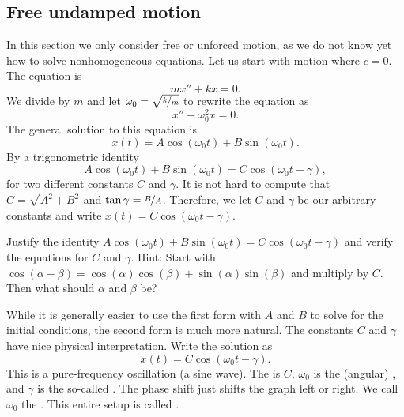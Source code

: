 \subsection{Free undamped motion}

In this section we only consider free or unforced motion,
as we do not know yet how to solve nonhomogeneous equations.  Let us start with
 motion where $c=0$.  The equation is
\begin{equation*}
mx'' + kx = 0 .
\end{equation*}
We divide by $m$ and let $\omega_0 = \sqrt{\nicefrac{k}{m}}$ to rewrite the equation as
\begin{equation*}
x'' + \omega_0^2 x = 0 .
\end{equation*}
The general solution to this equation is
\begin{equation*}
x(t) = A \cos (\omega_0 t) + B \sin (\omega_0 t) .
\end{equation*}
By a trigonometric identity
\begin{equation*}
A \cos (\omega_0 t) + B \sin (\omega_0 t) =
C \cos ( \omega_0 t - \gamma ) ,
\end{equation*}
for two different constants $C$ and $\gamma$.
It is not hard to compute that $C= \sqrt{A^2 + B^2}$ and $\tan \gamma =
\nicefrac{B}{A}$.  Therefore, we let
$C$ and $\gamma$ be our arbitrary constants and write
$x(t) = C \cos ( \omega_0 t - \gamma )$.

\begin{exercise}
Justify the identity $A \cos (\omega_0 t) + B \sin (\omega_0 t) =
C \cos ( \omega_0 t - \gamma )$ and verify the equations for $C$
and $\gamma$.  Hint: Start with
$\cos (\alpha-\beta) = \cos (\alpha) \cos
(\beta) + \sin (\alpha)\sin (\beta)$ and multiply by $C$.  Then what should
$\alpha$ and $\beta$ be?
\end{exercise}

While it is generally easier to use the first form with $A$ and $B$
to solve for the initial conditions, the second form is much
more natural.  The constants $C$ and $\gamma$ have nice physical interpretation.
Write the solution as
\begin{equation*}
x(t) = C \cos ( \omega_0 t - \gamma ) .
\end{equation*}
This is a pure-frequency oscillation (a sine wave).
The \emph{} is $C$, $\omega_0$ is the (angular)
\emph{},
and $\gamma$ is the so-called \emph{}.
The phase shift just shifts the
graph left or right.
We call $\omega_0$ the \emph{}.
This entire setup is 
called \emph{}.

